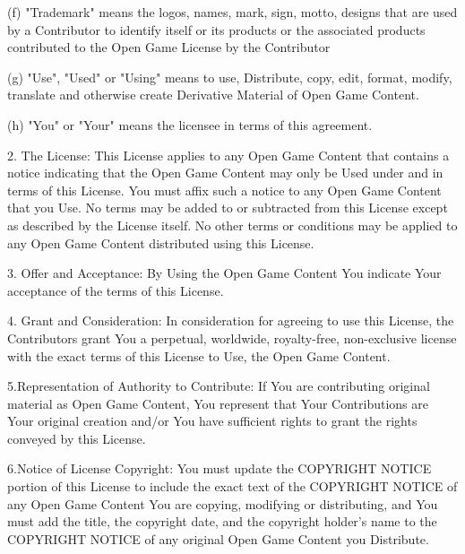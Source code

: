 \documentclass[11pt]{article}
\begin{document}
\bigskip

(f) "Trademark" means the logos, names, mark, sign, motto, designs that are used by a Contributor to identify itself or its products or the associated products contributed to the Open Game License by the Contributor

\bigskip

(g) "Use", "Used" or "Using" means to use, Distribute, copy, edit, format, modify, translate and otherwise create Derivative Material of Open Game Content.

\bigskip

(h) "You" or "Your" means the licensee in terms of this agreement.

\bigskip

2. The License: This License applies to any Open Game Content that contains a notice indicating that the Open Game Content may only be Used under and in terms of this License. You must affix such a notice to any Open Game Content that you Use. No terms may be added to or subtracted from this License except as described by the License itself. No other terms or conditions may be applied to any Open Game Content distributed using this License.

\bigskip

3. Offer and Acceptance: By Using the Open Game Content You indicate Your acceptance of the terms of this License.

\bigskip

4. Grant and Consideration: In consideration for agreeing to use this License, the Contributors grant You a perpetual, worldwide, royalty-free, non-exclusive license with the exact terms of this License to Use, the Open Game Content.

\bigskip

5.Representation of Authority to Contribute: If You are contributing original material as Open Game Content, You represent that Your Contributions are Your original creation and/or You have sufficient rights to grant the rights conveyed by this License.

\bigskip

6.Notice of License Copyright: You must update the COPYRIGHT NOTICE portion of this License to include the exact text of the COPYRIGHT NOTICE of any Open Game Content You are copying, modifying or distributing, and You must add the title, the copyright date, and the copyright holder's name to the COPYRIGHT NOTICE of any original Open Game Content you Distribute.

\bigskip
\end{document}
